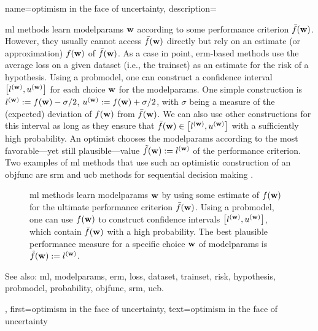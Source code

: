 {name={optimism in the face of uncertainty},
	description={\gls{ml} methods learn \gls{modelparams} ${\bf w}$ 
		according to some performance criterion $\bar{f}({\bf w})$. However, they usually 
		cannot access $\bar{f}({\bf w})$ directly but rely on an estimate (or approximation) 
		$f({\bf w})$ of $\bar{f}({\bf w})$. As a case in point, \gls{erm}-based methods use 
		the average \gls{loss} on a given \gls{dataset} (i.e., the \gls{trainset}) as an estimate 
		for the \gls{risk} of a \gls{hypothesis}. Using a \gls{probmodel}, one can construct 
		a confidence interval 
		$\big[ l^{({\bf w})},  u^{({\bf w})} \big]$ for each choice ${\bf w}$ for the \gls{modelparams}.
		One simple construction is $l^{({\bf w})} := f({\bf w}) - \sigma/2$, $u^{({\bf w})} := f({\bf w})+ \sigma/2$, 
	    	with $\sigma$ being a measure of the (expected) deviation of $f({\bf w})$ from $\bar{f}({\bf w})$.
		We can also use other constructions for this interval as long as they ensure that $\bar{f}({\bf w}) \in\big[ l^{({\bf w})},  u^{({\bf w})} \big]$ 
		with a sufficiently high \gls{probability}. An optimist chooses the \gls{modelparams} 
		according to the most favorable—yet still plausible—value $\tilde{f}({\bf w}) :=  l^{({\bf w})}$ 
		of the performance criterion. Two examples of \gls{ml} methods that use such an optimistic 
		construction of an \gls{objfunc} are \gls{srm} \cite[Ch. 11]{ShalevMLBook} and \gls{ucb} methods 
		for sequential decision making \cite[Sec. 2.2]{Bubeck2012}. 
		\begin{figure}[H]
				\begin{center}
\caption{\gls{ml} methods learn \gls{modelparams} ${\bf w}$ by using some estimate of $f({\bf w})$ for 
	the ultimate performance criterion $\bar{f}({\bf w})$. Using a \gls{probmodel}, one can use $f({\bf w})$ to 
	construct confidence intervals $\big[ l^{({\bf w})},  u^{({\bf w})} \big]$, which contain $\bar{f}({\bf w})$  
	with a high probability. The best plausible performance measure for a specific choice ${\bf w}$ of \gls{modelparams} 
	is $\tilde{f}({\bf w}) := l^{({\bf w})}$.} 
	\end{center}
		\end{figure}
		See also: \gls{ml}, \gls{modelparams}, \gls{erm}, \gls{loss}, \gls{dataset}, \gls{trainset}, \gls{risk}, \gls{hypothesis}, \gls{probmodel}, \gls{probability}, \gls{objfunc}, \gls{srm}, \gls{ucb}.},
	first={optimism in the face of uncertainty},
	text={optimism in the face of uncertainty} 
}

